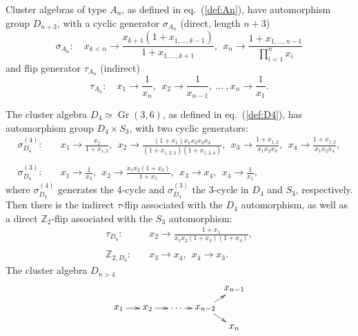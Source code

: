 \documentclass[11pt]{article}
\DeclareMathOperator{\Gr}{Gr}
\begin{document}
Cluster algebras of type $A_n$, as defined in eq.~(\ref{def:An}), have automorphism group $D_{n+3}$, with a cyclic generator $\sigma_{A_n}$ (direct, length $n+3$)
\begin{equation}
  \sigma_{A_n}:\quad x_{k<n} \to \frac{x_{k+1}(1+x_{1,\ldots,k-1})}{1+x_{1,\ldots,k+1}},~~x_n\to\frac{1+x_{1,\ldots,n-1}}{\prod_{i=1}^n x_i}
\end{equation}
and flip generator $\tau_{A_n}$ (indirect)
\begin{equation}
  \tau_{A_n}: \quad x_1 \to \frac{1}{x_n},~~x_2 \to \frac{1}{x_{n-1}},~\ldots~,x_n\to\frac{1}{x_1}.
\end{equation}

The cluster algebra $D_4 \simeq \Gr(3,6)$, as defined in eq.~(\ref{def:D4}), has automorphism group $D_4\times S_3$, with two cyclic generators: 
\begin{equation}
\begin{split}
  \sigma^{(4)}_{D_4}:\quad& 
    x_1\to\frac{x_2}{1+x_{1,2}},~~  
    x_2\to\frac{\left(1+x_1\right)x_1 x_2 x_3 x_4}{\left(1+x_{1,2,3}\right) \left(1+x_{1,2,4}\right)},~~
    x_3\to\frac{1+x_{1,2}}{x_1 x_2 x_3},~~
    x_4\to\frac{1+x_{1,2}}{x_1 x_2 x_4},\\ \\
  \sigma^{(3)}_{D_4}:\quad& 
    x_1\to \frac{1}{x_3},~~
    x_2\to \frac{x_1 x_2 \left(1+x_3\right)}{1+x_1},~~
    x_3\to x_4,~~
    x_4\to \frac{1}{x_1},
\end{split}  
\end{equation}
where $\sigma^{(4)}_{D_4}$ generates the 4-cycle and $\sigma^{(3)}_{D_4}$ the 3-cycle in $D_4$ and $S_3$, respectively. Then there is the indirect $\tau$-flip associated with the $D_4$ automorphism, as well as a direct $\mathbb{Z}_2$-flip associated with the $S_3$ automorphism:
\begin{equation}
\begin{split}
  \tau_{D_4}:\quad& 
    x_2\to \frac{1+x_1}{x_1 x_2 \left(1+x_3\right) \left(1+x_4\right)},\\ \\
  \mathbb{Z}_{2,D_4}:\quad& 
    x_3\to x_4,~~
    x_4\to x_3.
\end{split}  
\end{equation}
The cluster algebra $D_{n>4}$
\begin{equation}
    \begin{gathered}
    \begin{xy} 0;<1pt,0pt>:<0pt,-1pt>::
      (0,20) *+{x_1} ="1",
      (30,20) *+{x_2} ="2",
      (60,20) *+{\ldots} ="3",
      (90,20) *+{x_{n-2}} ="4",
      (120,0) *+{x_{n-1}} ="5",
      (120,40) *+{x_{n}} ="6",
      "1", {\ar"2"},
      "2", {\ar"3"},
      "3", {\ar"4"},
      "4", {\ar"5"},
      "4", {\ar"6"},
    \end{xy}
    \end{gathered}
\end{equation}
\end{document}
